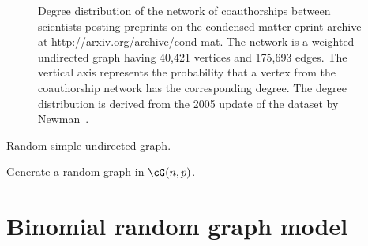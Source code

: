 \begin{figure}[!htbp]
\centering
{}

\caption{Degree distribution of the network of coauthorships between
  scientists posting preprints on the condensed matter eprint archive
  at \url{http://arxiv.org/archive/cond-mat}. The network is a
  weighted undirected graph having 40,421 vertices and 175,693
  edges. The vertical axis represents the probability that a vertex
  from the coauthorship network has the corresponding degree. The
  degree distribution is derived from the 2005 update of the dataset
  by Newman~\cite{Newman2001b}.}
\label{fig:random_graphs:degree_distribution:condensed_matter_collaboration}
\end{figure}

\begin{algorithm}[!htbp]

\caption{Random simple undirected graph.}
\label{alg:random_graphs:random_simple_graph}
\end{algorithm}

\begin{algorithm}[!htbp]

\caption{Generate a random graph in $\cG(n,p)$.}
\label{alg:random_graphs:generate_random_Gnp}
\end{algorithm}





\section{Binomial random graph model}

